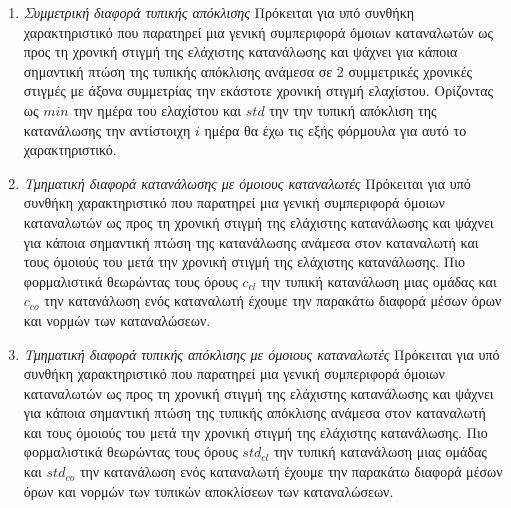 \documentclass[a4paper, 11pt]{article}
\begin{document}
\begin{enumerate}
\begin{center}
\end{center}
\item{\textit{Συμμετρική διαφορά τυπικής απόκλισης}} Πρόκειται για υπό συνθήκη χαρακτηριστικό που παρατηρεί μια γενική συμπεριφορά όμοιων καταναλωτών ως προς τη χρονική στιγμή της ελάχιστης κατανάλωσης και ψάχνει για κάποια σημαντική πτώση της τυπικής απόκλισης ανάμεσα σε 2 συμμετρικές χρονικές στιγμές με άξονα συμμετρίας την εκάστοτε χρονική στιγμή ελαχίστου. Ορίζοντας ως $min$ την ημέρα του ελαχίστου και $std$ την την τυπική απόκλιση της κατανάλωσης την αντίστοιχη $i$ ημέρα θα έχω τις εξής φόρμουλα για αυτό το χαρακτηριστικό. 
\begin{center}
\end{center}
\item{\textit{Τμηματική διαφορά κατανάλωσης με όμοιους καταναλωτές}} Πρόκειται για υπό συνθήκη χαρακτηριστικό που παρατηρεί μια γενική συμπεριφορά όμοιων καταναλωτών ως προς τη χρονική στιγμή της ελάχιστης κατανάλωσης και ψάχνει για κάποια σημαντική πτώση της κατανάλωσης ανάμεσα στον καταναλωτή και τους όμοιούς του μετά την χρονική στιγμή της ελάχιστης κατανάλωσης. Πιο φορμαλιστικά θεωρώντας τους όρους $c_{cl}$ την τυπική κατανάλωση μιας ομάδας και $c_{co}$ την κατανάλωση ενός καταναλωτή έχουμε την παρακάτω διαφορά μέσων όρων και νορμών των καταναλώσεων.
\begin{center}
\end{center}
\item{\textit{Τμηματική διαφορά τυπικής απόκλισης με όμοιους καταναλωτές}} Πρόκειται για υπό συνθήκη χαρακτηριστικό που παρατηρεί μια γενική συμπεριφορά όμοιων καταναλωτών ως προς τη χρονική στιγμή της ελάχιστης κατανάλωσης και ψάχνει για κάποια σημαντική πτώση της τυπικής απόκλισης ανάμεσα στον καταναλωτή και τους όμοιούς του μετά την χρονική στιγμή της ελάχιστης κατανάλωσης. Πιο φορμαλιστικά θεωρώντας τους όρους $std_{cl}$ την τυπική κατανάλωση μιας ομάδας και $std_{co}$ την κατανάλωση ενός καταναλωτή έχουμε την παρακάτω διαφορά μέσων όρων και νορμών των τυπικών αποκλίσεων των καταναλώσεων.

\end{enumerate}
\end{document}

